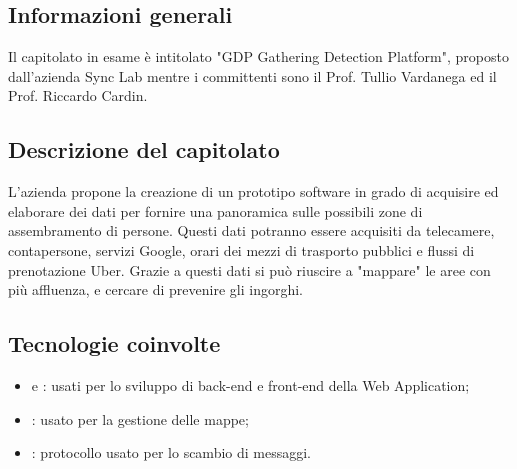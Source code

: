 \subsection{Informazioni generali}
Il capitolato in esame è intitolato "GDP Gathering Detection Platform", proposto dall'azienda Sync Lab mentre i committenti sono il Prof. Tullio Vardanega ed il Prof. Riccardo Cardin.
\subsection{Descrizione del capitolato}
L'azienda propone la creazione di un prototipo software in grado di acquisire ed elaborare dei dati per fornire una panoramica sulle possibili zone di assembramento di persone.
Questi dati potranno essere acquisiti da telecamere, contapersone, servizi Google, orari dei mezzi di trasporto pubblici e flussi di prenotazione Uber.
Grazie a questi dati si può riuscire a "mappare" le aree con più affluenza, e cercare di prevenire gli ingorghi.
\subsection{Tecnologie coinvolte}
\begin{itemize}
    \item {} e : usati per lo sviluppo di back-end e front-end della Web Application;
    \item {}: usato per la gestione delle mappe;
    \item {}: protocollo usato per lo scambio di messaggi.

\end{itemize}
